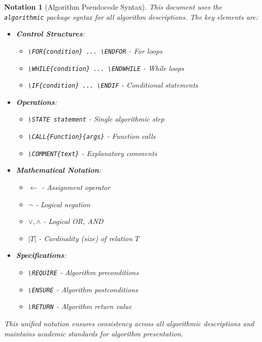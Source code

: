 \documentclass[12pt,a4paper]{article}
\newtheorem{notation}{Notation}[section]
\begin{document}
\begin{notation}[Algorithm Pseudocode Syntax]
This document uses the \texttt{algorithmic} package syntax for all algorithm descriptions. The key elements are:

\begin{itemize}
    \item \textbf{Control Structures}:
    \begin{itemize}
        \item \texttt{\textbackslash FOR\{condition\} ... \textbackslash ENDFOR} - For loops
        \item \texttt{\textbackslash WHILE\{condition\} ... \textbackslash ENDWHILE} - While loops  
        \item \texttt{\textbackslash IF\{condition\} ... \textbackslash ENDIF} - Conditional statements
    \end{itemize}
    \item \textbf{Operations}:
    \begin{itemize}
        \item \texttt{\textbackslash STATE statement} - Single algorithmic step
        \item \texttt{\textbackslash CALL\{Function\}\{args\}} - Function calls
        \item \texttt{\textbackslash COMMENT\{text\}} - Explanatory comments
    \end{itemize}
    \item \textbf{Mathematical Notation}:
    \begin{itemize}
        \item $\leftarrow$ - Assignment operator
        \item $\neg$ - Logical negation
        \item $\lor, \land$ - Logical OR, AND
        \item $|T|$ - Cardinality (size) of relation $T$
    \end{itemize}
    \item \textbf{Specifications}:
    \begin{itemize}
        \item \texttt{\textbackslash REQUIRE} - Algorithm preconditions
        \item \texttt{\textbackslash ENSURE} - Algorithm postconditions
        \item \texttt{\textbackslash RETURN} - Algorithm return value
    \end{itemize}
\end{itemize}

This unified notation ensures consistency across all algorithmic descriptions and maintains academic standards for algorithm presentation.
\end{notation}
\end{document}
